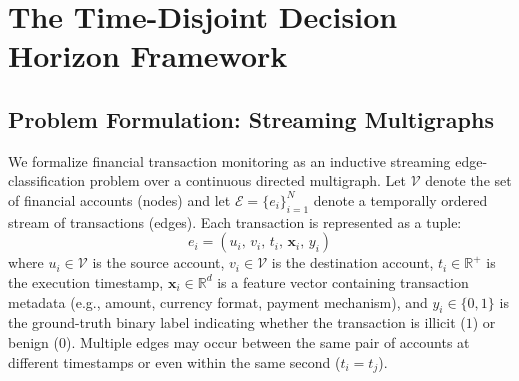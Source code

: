 \documentclass[10pt,twocolumn,letterpaper]{article}
\begin{document}
\section{The Time-Disjoint Decision Horizon Framework}
\label{sec:method}

\subsection{Problem Formulation: Streaming Multigraphs}
We formalize financial transaction monitoring as an inductive streaming edge-classification problem over a continuous directed multigraph. Let $\mathcal{V}$ denote the set of financial accounts (nodes) and let $\mathcal{E}=\{e_i\}_{i=1}^N$ denote a temporally ordered stream of transactions (edges). Each transaction is represented as a tuple:
\begin{equation}
e_i = (u_i, \, v_i, \, t_i, \, \mathbf{x}_i, \, y_i)
\end{equation}
where $u_i \in \mathcal{V}$ is the source account, $v_i \in \mathcal{V}$ is the destination account, $t_i \in \mathbb{R}^+$ is the execution timestamp, $\mathbf{x}_i \in \mathbb{R}^d$ is a feature vector containing transaction metadata (e.g., amount, currency format, payment mechanism), and $y_i \in \{0,1\}$ is the ground-truth binary label indicating whether the transaction is illicit ($1$) or benign ($0$). Multiple edges may occur between the same pair of accounts at different timestamps or even within the same second ($t_i = t_j$).
\end{document}
